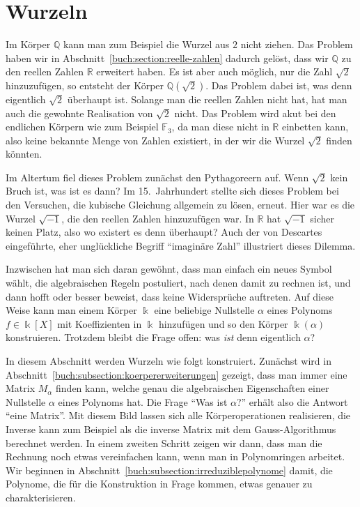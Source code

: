%
%
%
\section{Wurzeln
\label{buch:section:wurzeln}}
Im Körper $\mathbb{Q}$ kann man zum Beispiel die Wurzel aus $2$ nicht 
ziehen.
Das Problem haben wir in Abschnitt~\ref{buch:section:reelle-zahlen}
dadurch gelöst, dass wir $\mathbb{Q}$ zu den reellen Zahlen $\mathbb{R}$
erweitert haben.
Es ist aber auch möglich, nur die Zahl $\sqrt{2}$ hinzuzufügen,
so entsteht der Körper $\mathbb{Q}(\sqrt{2})$.
Das Problem dabei ist, was denn eigentlich $\sqrt{2}$ überhaupt ist.
Solange man die reellen Zahlen nicht hat, hat man auch die
gewohnte Realisation von $\sqrt{2}$ nicht.
Das Problem wird akut bei den endlichen Körpern wie zum Beispiel
$\mathbb{F}_3$,
da man diese nicht in $\mathbb{R}$ einbetten kann, also keine
bekannte Menge von Zahlen existiert, in der wir die Wurzel $\sqrt{2}$
finden könnten.

Im Altertum fiel dieses Problem zunächst den Pythagoreern auf.
Wenn $\sqrt{2}$ kein Bruch ist, was ist es dann?
Im 15.~Jahrhundert stellte sich dieses Problem bei den Versuchen, die
kubische Gleichung allgemein zu lösen, erneut.
Hier war es die Wurzel $\sqrt{-1}$, die den reellen Zahlen hinzuzufügen
war.
In $\mathbb{R}$ hat $\sqrt{-1}$ sicher keinen Platz, also wo existert
es denn überhaupt?
Auch der von Descartes eingeführte, eher unglückliche Begriff
``imaginäre Zahl'' illustriert dieses Dilemma.

Inzwischen hat man sich daran gewöhnt, dass man einfach ein neues Symbol
wählt, die algebraischen Regeln postuliert, nach denen damit zu rechnen
ist, und dann hofft oder besser beweist, dass keine Widersprüche auftreten.
Auf diese Weise kann man einem Körper $\Bbbk$ eine beliebige 
Nullstelle $\alpha$ eines Polynoms $f\in\Bbbk[X]$ mit Koeffizienten
in $\Bbbk$ hinzufügen und so den Körper $\Bbbk(\alpha)$ konstruieren.
Trotzdem bleibt die Frage offen: was {\em ist} denn eigentlich $\alpha$?

In diesem Abschnitt werden Wurzeln wie folgt konstruiert.
Zunächst wird in Abschnitt~\ref{buch:subsection:koerpererweiterungen}
gezeigt, dass man immer eine Matrix $M_\alpha$ finden kann, welche
genau die algebraischen Eigenschaften einer Nullstelle $\alpha$ eines
Polynoms hat.
Die Frage ``Was ist $\alpha$?'' erhält also die Antwort ``eine Matrix''.
Mit diesem Bild lassen sich alle Körperoperationen realisieren, die
Inverse kann zum Beispiel als die inverse Matrix mit dem
Gauss-Algorithmus berechnet werden.
In einem zweiten Schritt zeigen wir dann, dass man die Rechnung noch
etwas vereinfachen kann, wenn man in Polynomringen arbeitet.
Wir beginnen in Abschnitt~\ref{buch:subsection:irreduziblepolynome}
damit, die Polynome, die für die Konstruktion in Frage kommen, etwas
genauer zu charakterisieren.

